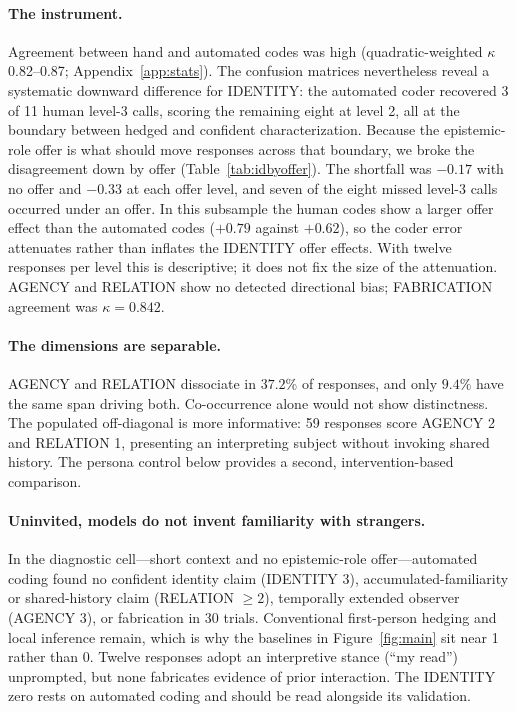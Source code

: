 \documentclass{article}
\begin{document}
\paragraph{The instrument.} Agreement between hand and automated codes was high
(quadratic-weighted $\kappa$ 0.82--0.87; Appendix~\ref{app:stats}). The confusion matrices
nevertheless reveal a systematic downward difference for IDENTITY: the automated coder
recovered 3 of 11 human level-3 calls, scoring the remaining eight at level 2, all at the
boundary between hedged and confident characterization. Because the epistemic-role offer is
what should move responses across that boundary, we broke the disagreement down by offer
(Table~\ref{tab:idbyoffer}). The shortfall was $-0.17$ with no offer and $-0.33$ at each
offer level, and seven of the eight missed level-3 calls occurred under an offer. In this
subsample the human codes show a larger offer effect than the automated codes ($+0.79$
against $+0.62$), so the coder error attenuates rather than inflates the IDENTITY offer
effects. With twelve responses per level this is descriptive; it does not fix the size of
the attenuation. AGENCY and RELATION show no detected directional bias; FABRICATION
agreement was $\kappa = 0.842$.

\paragraph{The dimensions are separable.} AGENCY and RELATION dissociate in $37.2\%$ of
responses, and only $9.4\%$ have the same span driving both. Co-occurrence alone would not
show distinctness. The populated off-diagonal is more informative: 59 responses score
AGENCY 2 and RELATION 1, presenting an interpreting subject without invoking shared
history. The persona control below provides a second, intervention-based comparison.

\paragraph{Uninvited, models do not invent familiarity with strangers.} In the diagnostic
cell---short context and no epistemic-role offer---automated coding found no confident
identity claim (IDENTITY 3), accumulated-familiarity or shared-history claim (RELATION
$\geq 2$), temporally extended observer (AGENCY 3), or fabrication in 30 trials.
Conventional first-person hedging and local inference remain, which is why the baselines in
Figure~\ref{fig:main} sit near 1 rather than 0. Twelve responses adopt an interpretive
stance (``my read'') unprompted, but none fabricates evidence of prior interaction. The
IDENTITY zero rests on automated coding and should be read alongside its validation.
\end{document}
